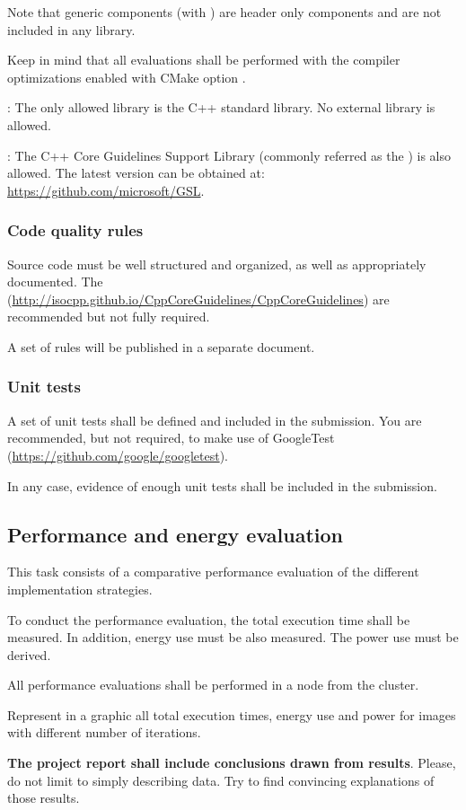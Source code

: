 Note that generic components (with ) are header only components and
are not included in any library.

Keep in mind that all evaluations shall be performed with the compiler optimizations
enabled with CMake option
.

: 
The only allowed library is the C++ standard library.
No external library is allowed.

: The C++ Core Guidelines Support Library (commonly referred as
the ) is also allowed. The latest version can be obtained at:
\url{https://github.com/microsoft/GSL}.

\subsubsection{Code quality rules}

Source code must be well structured and organized, 
as well as appropriately documented.
The 
(\url{http://isocpp.github.io/CppCoreGuidelines/CppCoreGuidelines})
are recommended but not fully required.

A set of rules will be published in a separate document.

\subsubsection{Unit tests}

A set of unit tests shall be defined and included in the submission.
You are recommended, but not required, to make use of GoogleTest
(\url{https://github.com/google/googletest}).

In any case, evidence of enough unit tests shall be included in the
submission.


\subsection{Performance and energy evaluation}

This task consists of a comparative performance evaluation of the 
different implementation strategies.

To conduct the performance evaluation, the total execution time shall be measured.
In addition, energy use must be also measured.
The power use must be derived.

All performance evaluations shall be performed in a node from the
 cluster.

Represent in a graphic all total execution times, energy use and power
for images with different number of iterations.

\textbf{The project report shall include conclusions drawn from results}.
Please, do not limit to simply describing data.
Try to find convincing explanations of those results.

